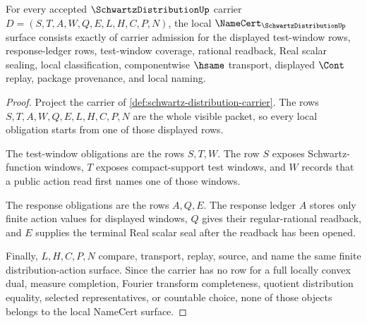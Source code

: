 \begin{theorem}\label{thm:schwartz-distribution-namecert-obligations}
For every accepted $\SchwartzDistributionUp$ carrier $D=(S,T,A,W,Q,E,L,H,C,P,N)$, the local $\NameCert_{\SchwartzDistributionUp}$ surface consists exactly of carrier admission for the displayed test-window rows, response-ledger rows, test-window coverage, rational readback, Real scalar sealing, local classification, componentwise $\hsame$ transport, displayed $\Cont$ replay, package provenance, and local naming.
\end{theorem}
\begin{proof}
Project the carrier of \autoref{def:schwartz-distribution-carrier}. The rows $S,T,A,W,Q,E,L,H,C,P,N$ are the whole visible packet, so every local obligation starts from one of those displayed rows.

The test-window obligations are the rows $S,T,W$. The row $S$ exposes Schwartz-function windows, $T$ exposes compact-support test windows, and $W$ records that a public action read first names one of those windows.

The response obligations are the rows $A,Q,E$. The response ledger $A$ stores only finite action values for displayed windows, $Q$ gives their regular-rational readback, and $E$ supplies the terminal Real scalar seal after the readback has been opened.

Finally, $L,H,C,P,N$ compare, transport, replay, source, and name the same finite distribution-action surface. Since the carrier has no row for a full locally convex dual, measure completion, Fourier transform completeness, quotient distribution equality, selected representatives, or countable choice, none of those objects belongs to the local NameCert surface.
\end{proof}

